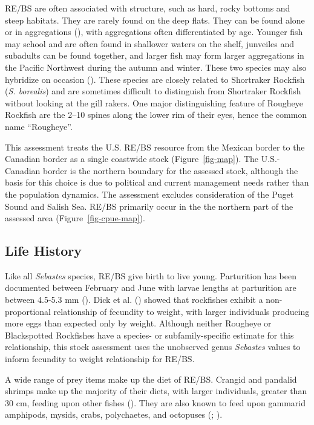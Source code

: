 \documentclass[
]{scrartcl}
\begin{document}
RE/BS are often associated with structure, such as hard, rocky bottoms
and steep habitats. They are rarely found on the deep flats. They can be
found alone or in aggregations
(), with aggregations often differentiated by age. Younger fish may
school and are often found in shallower waters on the shelf, junveiles
and subadults can be found together, and larger fish may form larger
aggregations in the Pacific Northwest during the autumn and winter.
These two species may also hybridize on occasion
(). These species are
closely related to Shortraker Rockfish (\emph{S. borealis}) and are
sometimes difficult to distinguish from Shortraker Rockfish without
looking at the gill rakers. One major distinguishing feature of Rougheye
Rockfish are the 2--10 spines along the lower rim of their eyes, hence
the common name ``Rougheye''.

This assessment treats the U.S. RE/BS resource from the Mexican border
to the Canadian border as a single coastwide stock
(Figure~\ref{fig-map}). The U.S.-Canadian border is the northern
boundary for the assessed stock, although the basis for this choice is
due to political and current management needs rather than the population
dynamics. The assessment excludes consideration of the Puget Sound and
Salish Sea. RE/BS primarily occur in the the northern part of the
assessed area (Figure~\ref{fig-cpue-map}).

\subsection{Life History}\label{life-history}

Like all \emph{Sebastes} species, RE/BS give birth to live young.
Parturition has been documented between February and June with larvae
lengths at parturition are between 4.5-5.3 mm
(). Dick et al. ()
showed that rockfishes exhibit a non-proportional relationship of
fecundity to weight, with larger individuals producing more eggs than
expected only by weight. Although neither Rougheye or Blackspotted
Rockfishes have a species- or subfamily-specific estimate for this
relationship, this stock assessment uses the unobserved genus
\emph{Sebastes} values to inform fecundity to weight relationship for
RE/BS.

A wide range of prey items make up the diet of RE/BS. Crangid and
pandalid shrimps make up the majority of their diets, with larger
individuals, greater than 30 cm, feeding upon other fishes
(). They are also known to
feed upon gammarid amphipods, mysids, crabs, polychaetes, and octopuses
(; ).
\end{document}

